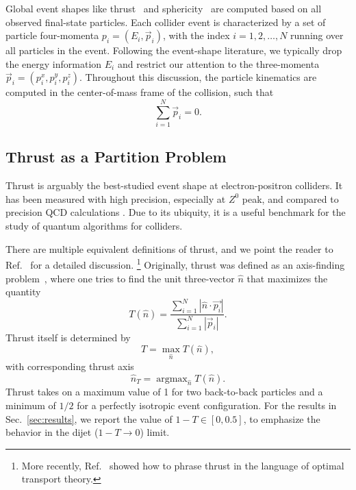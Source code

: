 \documentclass[aps,prd,twocolumn,superscriptaddress,preprintnumbers,nofootinbib,longbibliography,floatfix]{revtex4-1}
\DeclareMathOperator*{\argmax}{argmax}
\DeclareRobustCommand{\Sec}[1]{Sec.~\ref{sec:#1}}
\DeclareRobustCommand{\Ref}[1]{Ref.~\cite{#1}}
\begin{document}
Global event shapes like thrust~\cite{BRANDT196457,PhysRevLett.39.1587} and sphericity~\cite{PhysRevD.1.1416} are computed based on all observed final-state particles.
%
Each collider event is characterized by a set of particle four-momenta $p_{i} = (E_i, \vec{p}_{i})$, with the index $i=1,2, \ldots ,N$ running over all particles in the event. 
%
Following the event-shape literature, we typically drop the energy information $E_i$ and restrict our attention to the three-momenta $\vec{p}_{i} = (p_{i}^{x}, p_{i}^{y}, p_{i}^{z})$.
%
Throughout this discussion, the particle kinematics are computed in the center-of-mass frame of the collision, such that
%
\begin{equation}
\label{eq:center_of_mass_frame}
    \sum_{i = 1}^N \vec{p}_{i} = 0.
\end{equation}


\subsection{Thrust as a Partition Problem}
\label{sec:thrust_definition}

Thrust is arguably the best-studied event shape at electron-positron colliders.
%
It has been measured with high precision, especially at $Z^{0}$ peak, and compared to precision QCD calculations \cite{Abbiendi:2004qz,Heister:2003aj}.
%
Due to its ubiquity, it is a useful benchmark for the study of quantum algorithms for colliders.


There are multiple equivalent definitions of thrust, and we point the reader to \Ref{PhysRevD.101.094015} for a detailed discussion.%
%
\footnote{More recently, \Ref{Komiske:2020qhg} showed how to phrase thrust in the language of optimal transport theory.}
%
Originally, thrust was defined as an axis-finding problem~\cite{BRANDT196457,PhysRevLett.39.1587}, where one tries to find the unit three-vector $\hat{n}$ that maximizes the quantity
%
\begin{equation}
\label{eq:thrust_as_axis}
    T(\hat{n}) = \frac{\sum_{i = 1}^N|\hat{n}\cdot \vec{p_{i}}|}{\sum_{i = 1}^N |\vec{p}_{i}|}.
\end{equation}
%
Thrust itself is determined by
%
\begin{equation}
T = \max_{\hat{n}} T(\hat{n}),
\end{equation}
%
with corresponding thrust axis
%
\begin{equation}
\hat{n}_T = \argmax_{\hat{n}} T(\hat{n}).
\end{equation}
%
Thrust takes on a maximum value of 1 for two back-to-back particles and a minimum of $1/2$ for a perfectly isotropic event configuration.
%
For the results in \Sec{results}, we report the value of $1-T \in [0, 0.5]$, to emphasize the behavior in the dijet ($1-T \to 0$) limit.
\end{document}
